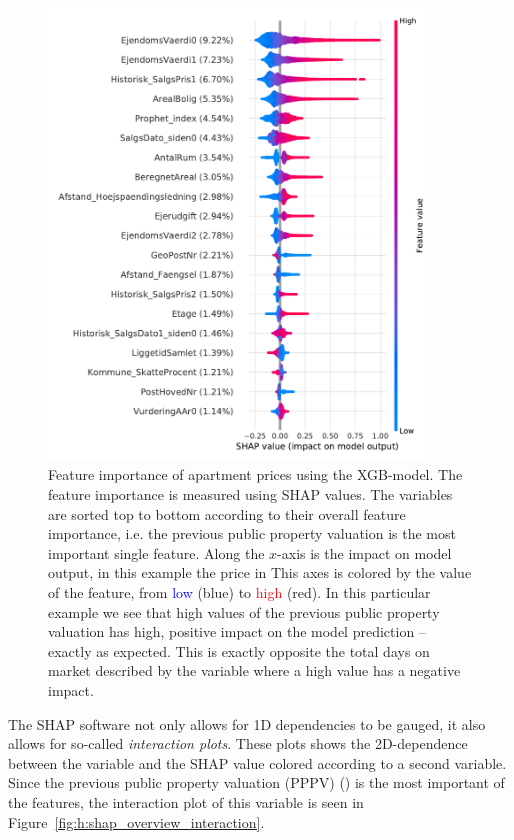 \begin{figure}[ht!]
  \centerfloat
  \includegraphics[width=0.9\textwidth, trim=0 0 0 1, clip]{figures/housing/Ejerlejlighed_v19_cut_all_Ncols_all_xgb_tight_SHAP_vals_summary.pdf}
  \caption[Feature importance of Apartments Prices Using XGB]
          {Feature importance of apartment prices using the XGB-model. The feature importance is measured using SHAP values. The variables are sorted top to bottom according to their overall feature importance, i.e. the previous public property valuation  is the most important single feature. Along the $x$-axis is the impact on model output, in this example the price in \si{\Mkr} This axes is colored by the value of the feature, from \textcolor{blue}{low} (blue) to \textcolor{red}{high} (red). In this particular example we see that high values of the previous public property valuation has high, positive impact on the model prediction -- exactly as expected. This is exactly opposite the total days on market described by the variable  where a high value has a negative impact.  
          } 
  \label{fig:h:shap_overview}
\end{figure}

The SHAP software \citep{lundbergConsistentIndividualizedFeature2018} not only allows for 1D dependencies to be gauged, it also allows for so-called \emph{interaction plots}. These plots shows the 2D-dependence between the variable and the SHAP value colored according to a second variable. Since the previous public property valuation (PPPV) () is the most important of the features, the interaction plot of this variable is seen in Figure~\ref{fig:h:shap_overview_interaction}. 


